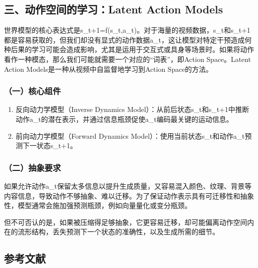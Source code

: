 \hypertarget{ux4e09ux52a8ux4f5cux7a7aux95f4ux7684ux5b66ux4e60latent-action-models}{%
\subsection{三、动作空间的学习：Latent Action Models}\label{ux4e09ux52a8ux4f5cux7a7aux95f4ux7684ux5b66ux4e60latent-action-models}}

世界模型的核心表达式是s\_t+1=f(s\_t,a\_t)。对于海量的视频数据，s\_t和s\_t+1都是容易获取的，但我们却没有显式的动作数据a\_t，这让模型对特定干预造成何种后果的学习可能会造成影响，尤其是运用于交互式或具身等场景时。如果将动作看作一种模态，那么我们可能就需要一个对应的``词表''，即Action Space。Latent Action Models是一种从视频中自监督地学习到Action Space的方法。

\hypertarget{ux4e00ux6838ux5fc3ux7ec4ux4ef6}{%
\subsubsection{（一）核心组件}\label{ux4e00ux6838ux5fc3ux7ec4ux4ef6}}

\begin{enumerate}
\def\labelenumi{\arabic{enumi}.}
\item
  反向动力学模型（Inverse Dynamics Model）：从前后状态s\_t和s\_t+1中推断动作a\_t的潜在表示，并通过信息瓶颈促使a\_t编码最关键的运动信息。
\item
  前向动力学模型（Forward Dynamics Model）：使用当前状态s\_t和动作a\_t预测下一状态s\_t+1。
\end{enumerate}

\hypertarget{ux4e8cux62bdux8c61ux8981ux6c42}{%
\subsubsection{（二）抽象要求}\label{ux4e8cux62bdux8c61ux8981ux6c42}}

如果允许动作a\_t保留太多信息以提升生成质量，又容易混入颜色、纹理、背景等内容信息，导致动作不够抽象、难以迁移。为了保证动作表示具有可迁移性和抽象性，模型通常会施加强预测瓶颈，例如向量量化或变分瓶颈。

但不可否认的是，如果被压缩得足够抽象，它更容易迁移，却可能偏离动作空间内在的流形结构，丢失预测下一个状态的准确性，以及生成所需的细节。

\hypertarget{ux53c2ux8003ux6587ux732e-155}{%
\subsection{参考文献}\label{ux53c2ux8003ux6587ux732e-155}}

